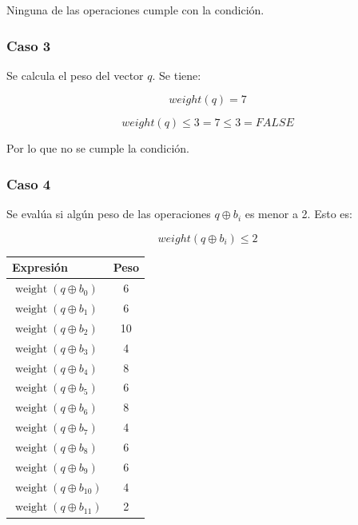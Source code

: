 Ninguna de las operaciones cumple con la condición.

\subsubsection*{Caso 3}

Se calcula el peso del vector $q$. Se tiene:

$$ weight(q) = 7 $$

$$ weight(q) \leq 3 = 7 \leq 3 = FALSE $$

Por lo que no se cumple la condición.

\subsubsection*{Caso 4}

Se evalúa si algún peso de las operaciones $q \oplus b_{i}$ es menor a 2. Esto es:

$$ weight(q \oplus b_{i}) \leq 2 $$

\begin{table}[H]
    \centering
    \begin{tabular}{lc}
        \hline
        \textbf{Expresión} & \textbf{Peso} \\
        \hline
        $\operatorname{weight}(q \oplus b_0)$  & 6  \\
        $\operatorname{weight}(q \oplus b_1)$  & 6  \\
        $\operatorname{weight}(q \oplus b_2)$  & 10 \\
        $\operatorname{weight}(q \oplus b_3)$  & 4  \\
        $\operatorname{weight}(q \oplus b_4)$  & 8  \\
        $\operatorname{weight}(q \oplus b_5)$  & 6  \\
        $\operatorname{weight}(q \oplus b_6)$  & 8  \\
        $\operatorname{weight}(q \oplus b_7)$  & 4  \\
        $\operatorname{weight}(q \oplus b_8)$  & 6  \\
        $\operatorname{weight}(q \oplus b_9)$  & 6  \\
        $\operatorname{weight}(q \oplus b_{10})$ & 4 \\
        $\operatorname{weight}(q \oplus b_{11})$ & 2 \\
        \hline
    \end{tabular}
\end{table}

